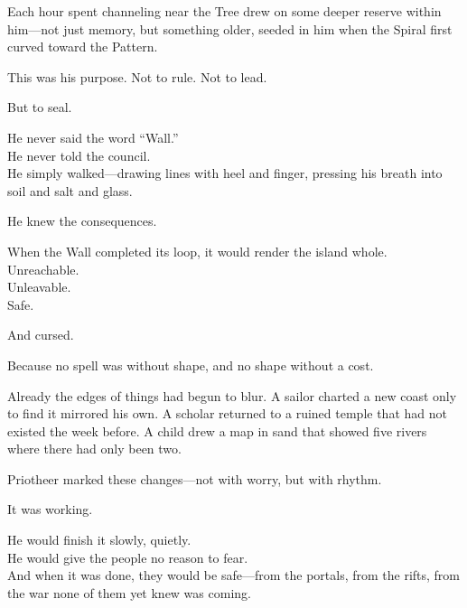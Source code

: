 \documentclass[9pt]{article}
\begin{document}
\vspace{0.5em}
Each hour spent channeling near the Tree drew on some deeper reserve within him---not just memory, but something older, seeded in him when the Spiral first curved toward the Pattern.

\vspace{0.5em}
This was his purpose. Not to rule. Not to lead.

\vspace{0.5em}
But to seal.

\vspace{0.5em}
He never said the word ``Wall.''\\
He never told the council.\\
He simply walked---drawing lines with heel and finger, pressing his breath into soil and salt and glass.

\vspace{0.5em}
He knew the consequences.

\vspace{0.5em}
When the Wall completed its loop, it would render the island whole.\\
Unreachable.\\
Unleavable.\\
Safe.

\vspace{0.5em}
And cursed.

\vspace{0.5em}
Because no spell was without shape, and no shape without a cost.

\vspace{0.5em}
Already the edges of things had begun to blur. A sailor charted a new coast only to find it mirrored his own. A scholar returned to a ruined temple that had not existed the week before. A child drew a map in sand that showed five rivers where there had only been two.

\vspace{0.5em}
Priotheer marked these changes---not with worry, but with rhythm.

\vspace{0.5em}
It was working.

\vspace{0.5em}
He would finish it slowly, quietly.\\
He would give the people no reason to fear.\\
And when it was done, they would be safe---from the portals, from the rifts, from the war none of them yet knew was coming.
\end{document}

